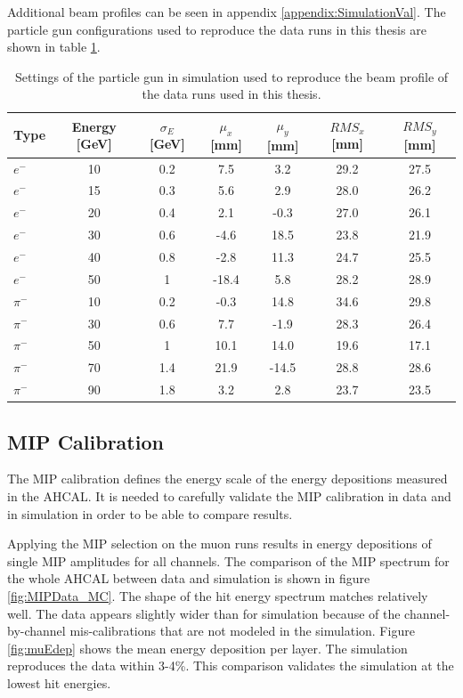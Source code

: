 Additional beam profiles can be seen in appendix \ref{appendix:SimulationVal}. The particle gun configurations used to reproduce the data runs in this thesis are shown in table \ref{table:ParticleGun}.

\begin{table}[htb!]
	\centering
	\caption{Settings of the particle gun in simulation used to reproduce the beam profile of the data runs used in this thesis.}
	\label{table:ParticleGun}
	\begin{tabular}{@{} lcccccc @{}}
		\toprule
		Type & Energy [GeV] & $\sigma_{E}$ [GeV] & $\mu_{x}$ [mm] & $\mu_{y}$ [mm] & $RMS_{x}$ [mm] & $RMS_{y}$ [mm] \\
		\midrule
		$e^-$ & 10 & 0.2 & 7.5 & 3.2 & 29.2 & 27.5\\
		$e^-$ & 15 & 0.3 & 5.6 & 2.9 & 28.0 & 26.2\\
		$e^-$ & 20 & 0.4 & 2.1 & -0.3 & 27.0 & 26.1\\
		$e^-$ & 30 & 0.6 & -4.6 & 18.5 & 23.8 & 21.9\\
		$e^-$ & 40 & 0.8 & -2.8 & 11.3 & 24.7 & 25.5\\
		$e^-$ & 50 & 1 & -18.4 & 5.8 & 28.2 & 28.9\\
		\midrule
		$\pi^-$ & 10 & 0.2 & -0.3 & 14.8 & 34.6 & 29.8\\
		$\pi^-$ & 30 & 0.6 & 7.7 & -1.9 & 28.3 & 26.4\\
		$\pi^-$ & 50 & 1 & 10.1 & 14.0 & 19.6 & 17.1\\
		$\pi^-$ & 70 & 1.4 & 21.9 & -14.5 & 28.8 & 28.6\\
		$\pi^-$ & 90 & 1.8 & 3.2 & 2.8 & 23.7 & 23.5\\
		\bottomrule
	\end{tabular}
\end{table}

\subsection{MIP Calibration}

The MIP calibration defines the energy scale of the energy depositions measured in the AHCAL. It is needed to carefully validate the MIP calibration in data and in simulation in order to be able to compare results.

Applying the MIP selection on the muon runs results in energy depositions of single MIP amplitudes for all channels. The comparison of the MIP spectrum for the whole AHCAL between data and simulation is shown in figure \ref{fig:MIPData_MC}. The shape of the hit energy spectrum matches relatively well. The data appears slightly wider than for simulation because of the channel-by-channel mis-calibrations that are not modeled in the simulation. Figure \ref{fig:muEdep} shows the mean energy deposition per layer. The simulation reproduces the data within 3-4\%. This comparison validates the simulation at the lowest hit energies.

